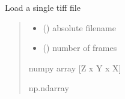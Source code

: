 \documentclass[letterpaper,10pt,english]{sphinxmanual}
\begin{document}
\begin{fulllineitems}
\label{\detokenize{CalSciPy.io:CalSciPy.io.load_single_tiff}}
\pysigstartsignatures
{}
\pysigstopsignatures
\sphinxAtStartPar
Load a single tiff file
\begin{quote}\begin{description}
\begin{itemize}
\item {} 
\sphinxAtStartPar
{} (\sphinxstyleliteralemphasis{\sphinxupquote{{[}}}\sphinxstyleliteralemphasis{\sphinxupquote{, }}\sphinxstyleliteralemphasis{\sphinxupquote{{]}}}) \sphinxhyphen{}\sphinxhyphen{} absolute filename

\item {} 
\sphinxAtStartPar
{} () \sphinxhyphen{}\sphinxhyphen{} number of frames

\end{itemize}

\sphinxAtStartPar
numpy array {[}Z x Y x X{]}

\sphinxAtStartPar
np.ndarray

\end{description}\end{quote}

\end{fulllineitems}

\end{document}
